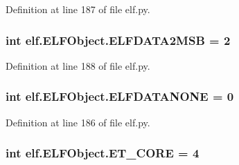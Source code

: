Definition at line 187 of file elf.\+py.

\subsubsection[{\texorpdfstring{E\+L\+F\+D\+A\+T\+A2\+M\+SB}{ELFDATA2MSB}}]{\setlength{\rightskip}{0pt plus 5cm}int elf.\+E\+L\+F\+Object.\+E\+L\+F\+D\+A\+T\+A2\+M\+SB = 2\hspace{0.3cm}{\ttfamily [static]}}\hypertarget{clasself_1_1_e_l_f_object_a5e1cd1702e4976b2d45e57e52ea75f1a}{}\label{clasself_1_1_e_l_f_object_a5e1cd1702e4976b2d45e57e52ea75f1a}


Definition at line 188 of file elf.\+py.

\subsubsection[{\texorpdfstring{E\+L\+F\+D\+A\+T\+A\+N\+O\+NE}{ELFDATANONE}}]{\setlength{\rightskip}{0pt plus 5cm}int elf.\+E\+L\+F\+Object.\+E\+L\+F\+D\+A\+T\+A\+N\+O\+NE = 0\hspace{0.3cm}{\ttfamily [static]}}\hypertarget{clasself_1_1_e_l_f_object_a1c76424eafe25407c1f8711ddb8b57c3}{}\label{clasself_1_1_e_l_f_object_a1c76424eafe25407c1f8711ddb8b57c3}


Definition at line 186 of file elf.\+py.

\subsubsection[{\texorpdfstring{E\+T\+\_\+\+C\+O\+RE}{ET_CORE}}]{\setlength{\rightskip}{0pt plus 5cm}int elf.\+E\+L\+F\+Object.\+E\+T\+\_\+\+C\+O\+RE = 4\hspace{0.3cm}{\ttfamily [static]}}\hypertarget{clasself_1_1_e_l_f_object_a3f91b929029f713a6578ed29fa0216e1}{}\label{clasself_1_1_e_l_f_object_a3f91b929029f713a6578ed29fa0216e1}


